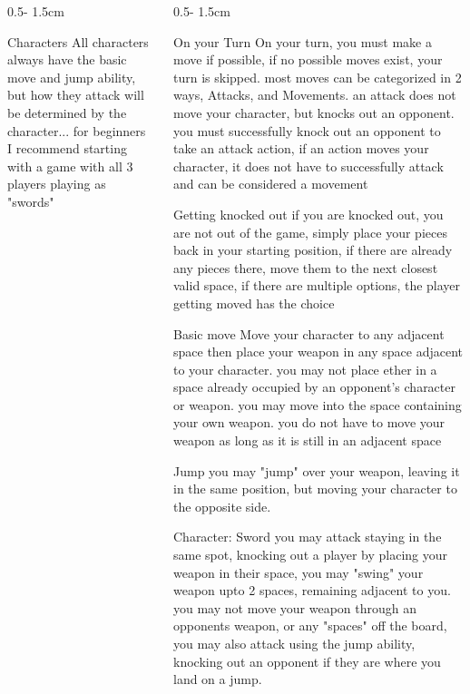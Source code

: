 \documentclass{uioposter}
\begin{document}
\begin{frame}
\begin{columns}[onlytextwidth]
\begin{column}{0.5\textwidth - 1.5cm}
    \begin{alertblock}{Characters}
        All characters always have the basic move and jump ability, but how they attack will be determined by the character... for beginners I recommend starting with a game with all 3 players playing as "swords"
    \end{alertblock}

\end{column}

\begin{column}{0.5\textwidth - 1.5cm}

    \begin{block}{On your Turn}
        On your turn, you must make a move if possible, if no possible moves exist, your turn is skipped. most moves can be categorized in 2 ways, Attacks, and Movements. an attack does not move your character, but knocks out an opponent. you must successfully knock out an opponent to take an attack action, if an action moves your character, it does not have to successfully attack and can be considered a movement
    \end{block}

    \begin{block}{Getting knocked out}
        if you are knocked out, you are not out of the game, simply place your pieces back in your starting position, if there are already any pieces there, move them to the next closest valid space, if there are multiple options, the player getting moved has the choice
    \end{block}
    
    \begin{block}{Basic move}
        Move your character to any adjacent space
        then place your weapon in any space adjacent to your character.
        you may not place ether in a space already occupied by an opponent's character or weapon.
        you may move into the space containing your own weapon.
        you do not have to move your weapon as long as it is still in an adjacent space
    \end{block}

    \begin{block}{Jump}
        you may "jump" over your weapon, leaving it in the same position, but moving your character to the opposite side.
    \end{block}

    \begin{exampleblock}{Character: Sword}
        you may attack staying in the same spot, knocking out a player by placing your weapon in their space, you may "swing" your weapon upto 2 spaces, remaining adjacent to you. you may not move your weapon through an opponents weapon, or any "spaces" off the board, you may also attack using the jump ability, knocking out an opponent if they are where you land on a jump.
    \end{exampleblock}


\end{column}
\end{columns}
\end{frame}
\end{document}
